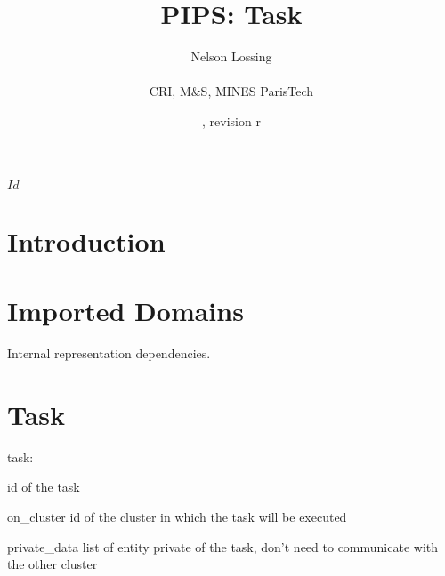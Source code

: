 \documentclass[a4paper]{article}
\title{PIPS: Task}
\author{Nelson Lossing \\
  \\
  CRI, M\&S, MINES ParisTech  \\
}
\date{\svnInfoLongDate{}, revision r\svnInfoRevision}
\begin{document}
\svnInfo $Id$

\maketitle
\section*{Introduction}


\section{Imported Domains}

Internal representation dependencies.

{}

{}

\section{Task}

task:

id of the task

on\_cluster id of the cluster in which the task will be executed

private\_data list of entity private of the task, don't need to communicate with the other cluster


{}


{}
\end{document}
